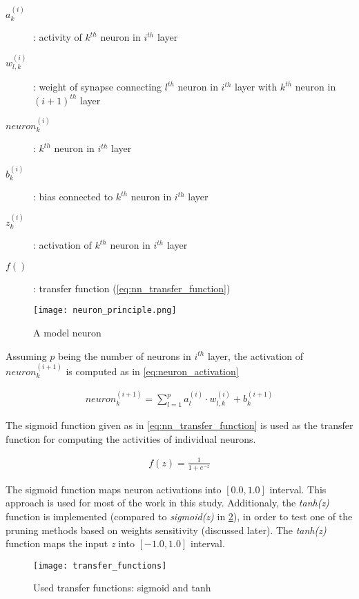\begin{description}
\item[$ a_k^{(i)} $] : activity of $ k^{th} $ neuron in $ i^{th} $ layer
\item[$ w_{l, k}^{(i)} $] : weight of synapse connecting $ l^{th} $ neuron in $ i^{th} $ layer with $ k^{th} $ neuron in $ (i+1)^{th} $ layer
\item[$ neuron_k^{(i)} $] : $ k^{th} $ neuron in $ i^{th} $ layer
\item[$ b_k^{(i)} $] : bias connected to $ k^{th} $ neuron in $ i^{th} $ layer
\item[$ z_k^{(i)} $] : activation of $ k^{th} $ neuron in $ i^{th} $ layer
\item[$ f() $] : transfer function (\cref{eq:nn_transfer_function})
\end{description}

\begin{figure}[H]
  \centering
  \texttt{[image: neuron\_principle.png]}
  \caption{A model neuron}
  \label{img:model_neuron}
\end{figure}

Assuming $ p $ being the number of neurons in $ i^{th} $ layer, the activation of $ neuron_k^{(i+1)} $ is computed as in \ref{eq:neuron_activation}

\begin{align} \label{eq:neuron_activation}
neuron_k^{(i+1)} = \displaystyle{\sum_{l=1}^{p} a_l^{(i)} \cdot w_{l,k}^{(i)}} + b_k^{(i+1)}
\end{align}

The sigmoid function given as in \cref{eq:nn_transfer_function} is used as the transfer function for computing the activities of individual neurons.

\begin{align} \label{eq:nn_transfer_function}
f(z) = \frac{1}{1 + e^{-z}}
\end{align}

The sigmoid function maps neuron activations into $ [0.0, 1.0] $ interval. This approach is used for most of the work in this study. Additionaly, the \textit{tanh(z)} function is implemented (compared to \textit{sigmoid(z)} in \cref{fig:transfer_functions}), in order to test one of the pruning methods based on weights sensitivity (discussed later). The \textit{tanh(z)} function maps the input \textit{z} into $ [-1.0, 1.0] $ interval.

\begin{figure}[H]
  \centering
  \texttt{[image: transfer\_functions]}
  \caption{Used transfer functions: sigmoid and tanh}
  \label{fig:transfer_functions}
\end{figure}

